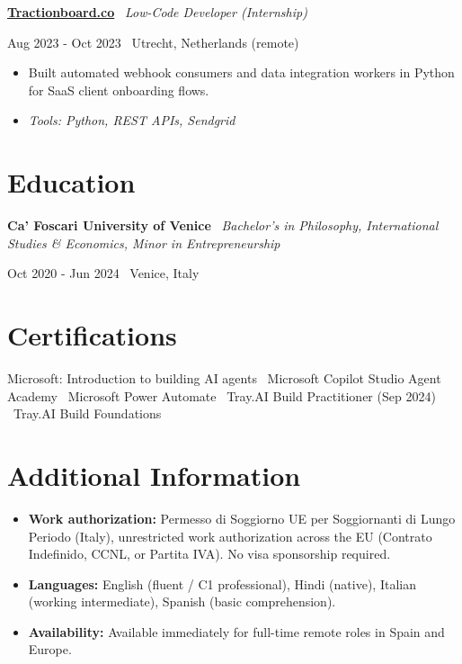 \documentclass[a4paper,10pt]{article}
\newcommand{\role}[4]{%
  \vspace{2pt}\noindent
  \begin{minipage}[t]{0.70\textwidth}\raggedright\textbf{#1} \textbullet\ \textit{#3}\end{minipage}%
  \hfill
  \begin{minipage}[t]{0.28\textwidth}\raggedleft\footnotesize\color{gray}#2 \textbullet\ #4\end{minipage}%
  \vspace{1pt}%
}
\begin{document}
\role{\href{https://tractionboard.co}{Tractionboard.co}}{Aug 2023 - Oct 2023}{Low-Code Developer (Internship)}{Utrecht, Netherlands (remote)}
\begin{itemize}
  \item Built automated webhook consumers and data integration workers in Python for SaaS client onboarding flows.
  \item \textit{Tools: Python, REST APIs, Sendgrid}
\end{itemize}

\section{Education}
\role{Ca' Foscari University of Venice}{Oct 2020 - Jun 2024}{Bachelor's in Philosophy, International Studies \& Economics, Minor in Entrepreneurship}{Venice, Italy}

\section{Certifications}
Microsoft: Introduction to building AI agents \textbullet\ Microsoft Copilot Studio Agent Academy \textbullet\ Microsoft Power Automate \textbullet\ Tray.AI Build Practitioner (Sep 2024) \textbullet\ Tray.AI Build Foundations

\section{Additional Information}
\begin{itemize}
  \item \textbf{Work authorization:} Permesso di Soggiorno UE per Soggiornanti di Lungo Periodo (Italy), unrestricted work authorization across the EU (Contrato Indefinido, CCNL, or Partita IVA). No visa sponsorship required.
  \item \textbf{Languages:} English (fluent / C1 professional), Hindi (native), Italian (working intermediate), Spanish (basic comprehension).
  \item \textbf{Availability:} Available immediately for full-time remote roles in Spain and Europe.
\end{itemize}

\end{document}
